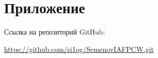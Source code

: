 \section*{Приложение}

Ссылка на репозиторий GitHub:

\hspace{30pt}\url{https://github.com/si1og/SemenovIAFPCW.git}
